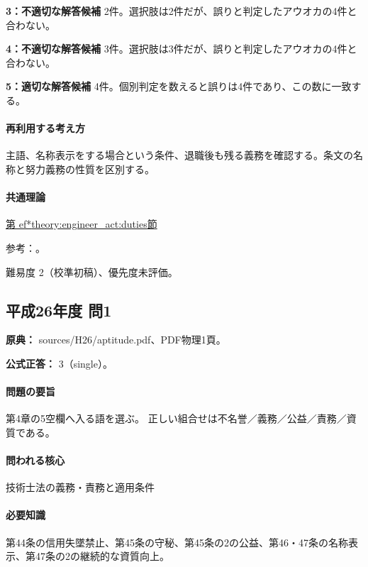 \noindent\textbf{3：不適切な解答候補} 2件。選択肢は2件だが、誤りと判定したアウオカの4件と合わない。\par

\noindent\textbf{4：不適切な解答候補} 3件。選択肢は3件だが、誤りと判定したアウオカの4件と合わない。\par

\noindent\textbf{5：適切な解答候補} 4件。個別判定を数えると誤りは4件であり、この数に一致する。\par

\paragraph{再利用する考え方} 主語、名称表示をする場合という条件、退職後も残る義務を確認する。条文の名称と努力義務の性質を区別する。

\paragraph{共通理論} \hyperref[theory:engineer_act:duties]{第
ef*{theory:engineer_act:duties}節}

\par 参考：\cite{engineer_act_current}。

\par 難易度 2（校準初稿）、優先度未評価。

\subsection{平成26年度 問1}
\label{q:h26-reg-apt-01}

\noindent\textbf{原典：} sources/H26/aptitude.pdf、PDF物理1頁。

\textbf{公式正答：} 3（single）。

\paragraph{問題の要旨} 第4章の5空欄へ入る語を選ぶ。 正しい組合せは不名誉／義務／公益／責務／資質である。

\paragraph{問われる核心} 技術士法の義務・責務と適用条件

\paragraph{必要知識} 第44条の信用失墜禁止、第45条の守秘、第45条の2の公益、第46・47条の名称表示、第47条の2の継続的な資質向上。

